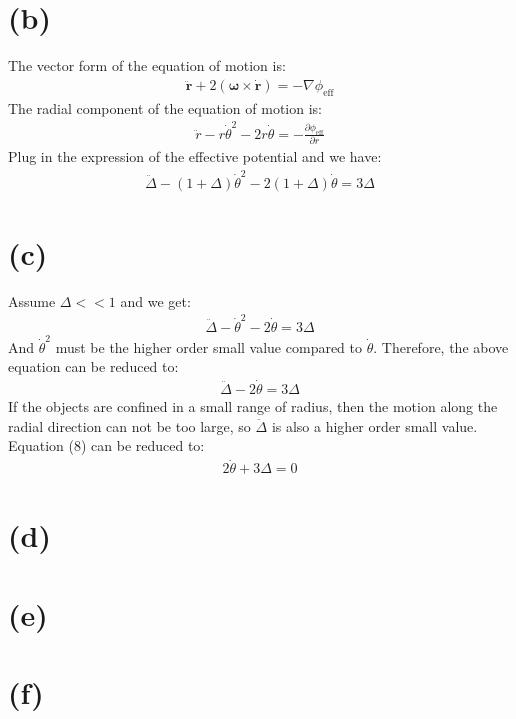 \documentclass[a4paper,12pt]{article}
\begin{document}
\section*{(b)}
The vector form of the equation of motion is:
\begin{align*}
    \ddot{\boldsymbol{r}} + 2(\boldsymbol{\omega} \times \dot{\boldsymbol{r}}) = - \nabla \phi_{\text{eff}}
\end{align*}
The radial component of the equation of motion is:
\begin{align*}
    \ddot{r} - r\dot \theta^2 -2 r \dot{\theta}= - \frac{\partial \phi_{\text{eff}}}{\partial r}
\end{align*}
Plug in the expression of the effective potential and we have:
\begin{align*}
    \ddot{\Delta} - (1 + \Delta) \dot{\theta}^2 - 2(1 + \Delta)\dot{\theta} = 3\Delta
\end{align*}

\section*{(c)}
Assume $\Delta << 1$ and we get:
\begin{align*}
    \ddot{\Delta} - \dot{\theta}^2 - 2\dot{\theta} = 3\Delta
\end{align*}
And $\dot{\theta}^2$ must be the higher order small value compared to $\dot{\theta}$. 
Therefore, the above equation can be reduced to:
\begin{align*}
    \ddot{\Delta} - 2\dot{\theta} = 3\Delta
\end{align*}
If the objects are confined in a small range of radius, then the motion 
along the radial direction can not be too large, so $\ddot{\Delta}$ is also a 
higher order small value. Equation (8) can be reduced to:
\begin{align*}
    2\dot{\theta} + 3\Delta = 0
\end{align*}

\section*{(d)}


\section*{(e)}

\section*{(f)}
\end{document}

